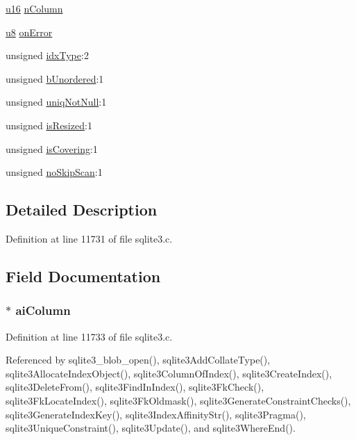 \begin{DoxyCompactItemize}
$$\item 
\hyperlink{sqlite3_8c_a20f2299e322dcbde37cb07b16910b843}{u16} \hyperlink{struct_index_af9c109e52691a25cd6fef2db6db26023}{n\+Column}
\item 
\hyperlink{sqlite3_8c_a74a0f6424ae628af25f23f0a35f6ead3}{u8} \hyperlink{struct_index_acae3cdb7acfb920686612099f16c0ff4}{on\+Error}
\item 
unsigned \hyperlink{struct_index_afad240fb2079e16ef9b5a37f9de33d2a}{idx\+Type}\+:2
\item 
unsigned \hyperlink{struct_index_a80ec7995a89046bf631739246c060d43}{b\+Unordered}\+:1
\item 
unsigned \hyperlink{struct_index_ab2797a34b09eb3e8a38eb169d86e2b5c}{uniq\+Not\+Null}\+:1
\item 
unsigned \hyperlink{struct_index_af51f4d44e128b234d35c43e628d59975}{is\+Resized}\+:1
\item 
unsigned \hyperlink{struct_index_a753f098d7b22502da28d12ba59dc68f3}{is\+Covering}\+:1
\item 
unsigned \hyperlink{struct_index_aec7ded06f38b4e8c98929cd2f270e59c}{no\+Skip\+Scan}\+:1
\end{DoxyCompactItemize}


\subsection{Detailed Description}


Definition at line 11731 of file sqlite3.\+c.



\subsection{Field Documentation}
\hypertarget{struct_index_a60b1008813549b5b60155ed0f9656000}{}
\subsubsection[{ai\+Column}]{$\ast$ ai\+Column}\label{struct_index_a60b1008813549b5b60155ed0f9656000}


Definition at line 11733 of file sqlite3.\+c.



Referenced by sqlite3\+\_\+blob\+\_\+open(), sqlite3\+Add\+Collate\+Type(), sqlite3\+Allocate\+Index\+Object(), sqlite3\+Column\+Of\+Index(), sqlite3\+Create\+Index(), sqlite3\+Delete\+From(), sqlite3\+Find\+In\+Index(), sqlite3\+Fk\+Check(), sqlite3\+Fk\+Locate\+Index(), sqlite3\+Fk\+Oldmask(), sqlite3\+Generate\+Constraint\+Checks(), sqlite3\+Generate\+Index\+Key(), sqlite3\+Index\+Affinity\+Str(), sqlite3\+Pragma(), sqlite3\+Unique\+Constraint(), sqlite3\+Update(), and sqlite3\+Where\+End().

